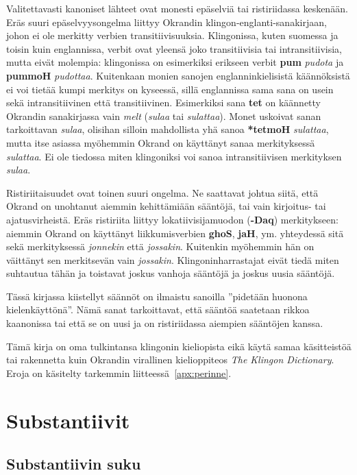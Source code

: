 \documentclass{book}
\begin{document}
Valitettavasti kanoniset lähteet ovat monesti epäselviä tai ristiriidassa keskenään. Eräs suuri epäselvyysongelma liittyy Okrandin klingon-englanti-sanakirjaan, johon ei ole merkitty verbien transitiivisuuksia. Klingonissa, kuten suomessa ja toisin kuin englannissa, verbit ovat yleensä joko transitiivisia tai intransitiivisia, mutta eivät molempia: klingonissa on esimerkiksi erikseen verbit \textbf{pum} \textit{pudota} ja \textbf{pummoH} \textit{pudottaa}. Kuitenkaan monien sanojen englanninkielisistä käännöksistä ei voi tietää kumpi merkitys on kyseessä, sillä englannissa sama sana on usein sekä intransitiivinen että transitiivinen. Esimerkiksi sana \textbf{tet} on käännetty Okrandin sanakirjassa vain \textit{melt} (\textit{sulaa} tai \textit{sulattaa}). Monet uskoivat sanan tarkoittavan \textit{sulaa}, olisihan silloin mahdollista yhä sanoa \textbf{*tetmoH} \textit{sulattaa}, mutta itse asiassa myöhemmin Okrand on käyttänyt sanaa merkityksessä \textit{sulattaa}. Ei ole tiedossa miten klingoniksi voi sanoa intransitiivisen merkityksen \textit{sulaa}.

Ristiriitaisuudet ovat toinen suuri ongelma. Ne saattavat johtua siitä, että Okrand on unohtanut aiemmin kehittämiään sääntöjä, tai vain kirjoitus- tai ajatusvirheistä. Eräs ristiriita liittyy lokatiivisijamuodon (\textbf{-Daq}) merkitykseen: aiemmin Okrand on käyttänyt liikkumisverbien \textbf{ghoS}, \textbf{jaH}, ym. yhteydessä sitä sekä merkityksessä \textit{jonnekin} että \textit{jossakin}. Kuitenkin myöhemmin hän on väittänyt sen merkitsevän vain \textit{jossakin}. Klingoninharrastajat eivät tiedä miten suhtautua tähän ja toistavat joskus vanhoja sääntöjä ja joskus uusia sääntöjä.

Tässä kirjassa kiistellyt säännöt on ilmaistu sanoilla ''pidetään huonona kielenkäyttönä''. Nämä sanat tarkoittavat, että sääntöä saatetaan rikkoa kaanonissa tai että se on uusi ja on ristiriidassa aiempien sääntöjen kanssa.

Tämä kirja on oma tulkintansa klingonin kieliopista eikä käytä samaa käsitteistöä tai rakennetta kuin Okrandin virallinen kielioppiteos \textit{The Klingon Dictionary}. Eroja on käsitelty tarkemmin liitteessä~\ref{apx:perinne}.

\chapter{Substantiivit}

\section{Substantiivin suku}
\end{document}
